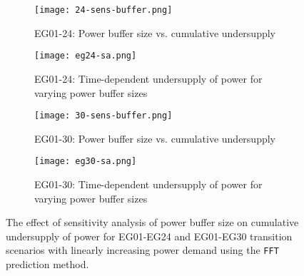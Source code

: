 \begin{figure}[]
	\centering
	\begin{subfigure}[t]{0.8\textwidth}
		\centering
		\texttt{[image: 24-sens-buffer.png]} 
		\caption{EG01-24: Power buffer size vs. cumulative undersupply}
		\label{fig:eg24-bufplot}
	\end{subfigure}
	\vspace{1cm}
	\begin{subfigure}[t]{0.8\textwidth}
		\centering
		\texttt{[image: eg24-sa.png]} 
		\caption{EG01-24: Time-dependent undersupply of power for varying power buffer sizes}
		\label{fig:eg24-dotplot}
	\end{subfigure}
	\begin{subfigure}[t]{0.8\textwidth}
		\centering
		\texttt{[image: 30-sens-buffer.png]} 
		\caption{EG01-30: Power buffer size vs. cumulative undersupply}
		\label{fig:eg30-bufplot}
	\end{subfigure}
	\begin{subfigure}[t]{0.8\textwidth}
		\centering
		\texttt{[image: eg30-sa.png]} 
		\caption{EG01-30: Time-dependent undersupply of power for varying power buffer sizes}
		\label{fig:eg30-dotplot}
	\end{subfigure}
	\hfill
	\caption{The effect of sensitivity analysis of power buffer size on cumulative 
	undersupply of power for EG01-EG24 and EG01-EG30 transition scenarios 
	with linearly increasing power demand using the \texttt{FFT} prediction method.}
	\label{fig:sabuffer}
\end{figure}


